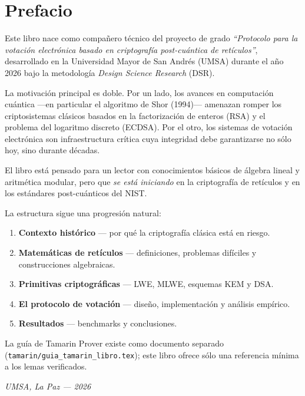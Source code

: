 \documentclass[12pt,a4paper,twoside,openright]{book}
\theoremstyle{plain}
\theoremstyle{definition}
\theoremstyle{remark}
\begin{document}
\chapter*{Prefacio}

Este libro nace como compa\~nero t\'ecnico del proyecto de grado
\textit{``Protocolo para la votaci\'on electr\'onica basado en criptograf\'ia
post-cu\'antica de ret\'iculos''}, desarrollado en la Universidad Mayor de San
Andr\'es (UMSA) durante el a\~no 2026 bajo la metodolog\'ia \textit{Design
Science Research} (DSR).

\medskip
La motivaci\'on principal es doble. Por un lado, los avances en computaci\'on
cu\'antica ---en particular el algoritmo de Shor (1994)--- amenazan romper los
criptosistemas cl\'asicos basados en la factorizaci\'on de enteros (RSA) y el
problema del logaritmo discreto (ECDSA). Por el otro, los sistemas de
votaci\'on electr\'onica son infraestructura cr\'itica cuya integridad debe
garantizarse no s\'olo hoy, sino durante d\'ecadas.

\medskip
El libro est\'a pensado para un lector con conocimientos b\'asicos de \'algebra
lineal y aritm\'etica modular, pero que \emph{se est\'a iniciando} en la
criptograf\'ia de ret\'iculos y en los est\'andares post-cu\'anticos del NIST.

\medskip
La estructura sigue una progresi\'on natural:
\begin{enumerate}
  \item \textbf{Contexto hist\'orico} --- por qu\'e la criptograf\'ia cl\'asica
        est\'a en riesgo.
  \item \textbf{Matem\'aticas de ret\'iculos} --- definiciones, problemas
        dif\'iciles y construcciones algebraicas.
  \item \textbf{Primitivas criptogr\'aficas} --- LWE, MLWE, esquemas KEM y DSA.
  \item \textbf{El protocolo de votaci\'on} --- dise\~no, implementaci\'on y
        an\'alisis emp\'irico.
  \item \textbf{Resultados} --- benchmarks y conclusiones.
\end{enumerate}

\medskip
La gu\'ia de Tamarin Prover existe como documento separado
(\texttt{tamarin/guia\_tamarin\_libro.tex}); este libro ofrece s\'olo
una referencia m\'inima a los lemas verificados.

\vspace{1cm}
\noindent\textit{UMSA, La Paz --- 2026}
\end{document}
